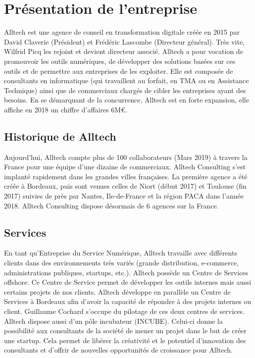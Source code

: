 \section{Présentation de l'entreprise} \label{sec:presentation_entreprise}

Alltech est une agence de conseil en transformation digitale créée en 2015 par David Claverie (Président) et Frédéric 
Lascombe (Directeur général). Très vite, Wilfrid Picq les rejoint et devient directeur associé. Alltech a pour vocation 
de promouvoir les outils numériques, de développer des solutions basées sur ces outils et de permettre aux entreprises 
de les exploiter. Elle est composée de consultants en informatique (qui travaillent au forfait, en TMA ou en Assistance 
Technique) ainsi que de commerciaux chargés de cibler les entreprises ayant des besoins. En se démarquant de la 
concurrence, Alltech est en forte expansion, elle affiche en 2018 un chiffre d’affaires 6M€.

\subsection {Historique de Alltech}

Aujourd’hui, Alltech compte plus de 100 collaborateurs (Mars 2019) à travers la France pour une équipe d’une dizaine de 
commerciaux. Alltech Consulting s’est implanté rapidement dans les grandes villes françaises. La première agence a été 
créée à Bordeaux, puis sont venues celles de Niort (début 2017) et Toulouse (fin 2017) suivies de près par Nantes, 
Ile-de-France et la région PACA dans l’année 2018. Alltech Consulting dispose désormais de 6 agences sur la France.

\subsection {Services}

En tant qu’Entreprise du Service Numérique, Alltech travaille avec différents clients dans des environnements très 
variés (grande distribution, e-commerce, administrations publiques, startups, etc.). Alltech possède un Centre de 
Services offshore. Ce Centre de Service permet de développer les outils internes mais aussi certains projets de nos 
clients. Alltech développe en parallèle un Centre de Services à Bordeaux afin d’avoir la capacité de répondre à des 
projets internes ou client. Guillaume Cochard s’occupe du pilotage de ces deux centres de services.
Alltech dispose aussi d’un pôle incubateur (INCUBE). Celui-ci donne la possibilité aux consultants de la société de 
mener un projet dans le but de créer une startup. Cela permet de libérer la créativité et le potentiel d’innovation des 
consultants et d’offrir de nouvelles opportunités de croissance pour Alltech.

